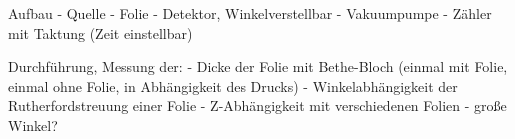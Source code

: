 Aufbau
- Quelle
- Folie
- Detektor, Winkelverstellbar
- Vakuumpumpe
- Zähler mit Taktung (Zeit einstellbar)

Durchführung, Messung der:
- Dicke der Folie mit Bethe-Bloch (einmal mit Folie, einmal ohne Folie, in Abhängigkeit des Drucks)
- Winkelabhängigkeit der Rutherfordstreuung einer Folie
- Z-Abhängigkeit mit verschiedenen Folien
- große Winkel?
